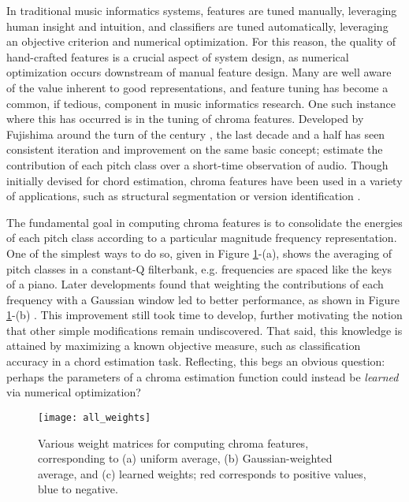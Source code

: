 In traditional music informatics systems, features are tuned manually, leveraging human insight and intuition, and classifiers are tuned automatically, leveraging an objective criterion and numerical optimization.
For this reason, the quality of hand-crafted features is a crucial aspect of system design, as numerical optimization occurs downstream of manual feature design.
Many are well aware of the value inherent to good representations, and feature tuning has become a common, if tedious, component in music informatics research.
One such instance where this has occurred is in the tuning of chroma features.
Developed by Fujishima around the turn of the century \cite{Fujishima1999Realtime}, the last decade and a half has seen consistent iteration and improvement on the same basic concept; estimate the contribution of each pitch class over a short-time observation of audio.
Though initially devised for chord estimation, chroma features have been used in a variety of applications, such as structural segmentation \cite{Levy2007Comparison} or version identification \cite{Salamon2013Tonal}.

The fundamental goal in computing chroma features is to consolidate the energies of each pitch class according to a particular magnitude frequency representation.
One of the simplest ways to do so, given in Figure \ref{fig:all_weights}-(a), shows the averaging of pitch classes in a constant-Q filterbank, e.g. frequencies are spaced like the keys of a piano.
Later developments found that weighting the contributions of each frequency with a Gaussian window led to better performance, as shown in Figure \ref{fig:all_weights}-(b) \cite{Cho2014Improved}.
This improvement still took time to develop, further motivating the notion that other simple modifications remain undiscovered.
That said, this knowledge is attained by maximizing a known objective measure, such as classification accuracy in a chord estimation task.
Reflecting, this begs an obvious question: perhaps the parameters of a chroma estimation function could instead be \emph{learned} via numerical optimization?

\begin{figure}
\begin{centering}
\texttt{[image: all\_weights]}
\caption{Various weight matrices for computing chroma features, corresponding to (a) uniform average, (b) Gaussian-weighted average, and (c) learned weights; red corresponds to positive values, blue to negative.}
\label{fig:all_weights}
\end{centering}
\end{figure}

